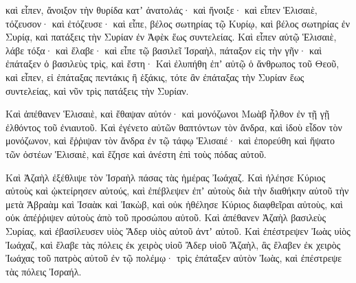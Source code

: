 {καὶ εἶπεν, ἄνοιξον τὴν θυρίδα κατʼ ἀνατολάς· καὶ ἤνοιξε· καὶ εἶπεν Ἑλισαιὲ, τόζευσον· καὶ ἐτόζευσε· καὶ εἶπε, βέλος σωτηρίας τῷ Κυρίῳ, καὶ βέλος σωτηρίας ἐν Συρίᾳ, καὶ πατάξεις τὴν Συρίαν ἐν Ἀφὲκ ἕως συντελείας.
Καὶ εἶπεν αὐτῷ Ἑλισαιὲ, λάβε τόξα· καὶ ἔλαβε· καὶ εἶπε τῷ βασιλεῖ Ἰσραὴλ, πάταξον εἰς τὴν γῆν· καὶ ἐπάταξεν ὁ βασιλεὺς τρὶς, καὶ ἔστη·
Καὶ ἐλυπήθη ἐπʼ αὐτῷ ὁ ἄνθρωπος τοῦ Θεοῦ, καὶ εἶπεν, εἰ ἐπάταξας πεντάκις ἢ ἑξάκις, τότε ἂν ἐπάταξας τὴν Συρίαν ἕως συντελείας, καὶ νῦν τρὶς πατάξεις τὴν Συρίαν.
\par }{\PP {}Καὶ ἀπέθανεν Ἑλισαιὲ, καὶ ἔθαψαν αὐτόν· καὶ μονόζωνοι Μωὰβ ἦλθον ἐν τῇ γῇ ἐλθόντος τοῦ ἐνιαυτοῦ.
Καὶ ἐγένετο αὐτῶν θαπτόντων τὸν ἄνδρα, καὶ ἰδοὺ εἶδον τὸν μονόζωνον, καὶ ἔῤῥιψαν τὸν ἄνδρα ἐν τῷ τάφῳ Ἑλισαιέ· καὶ ἐπορεύθη καὶ ἥψατο τῶν ὀστέων Ἑλισαιὲ, καὶ ἔζησε καὶ ἀνέστη ἐπὶ τοὺς πόδας αὐτοῦ.
\par }{\PP {}Καὶ Ἀζαὴλ ἐξέθλιψε τὸν Ἰσραὴλ πάσας τὰς ἡμέρας Ἰωάχαζ.
Καὶ ἠλέησε Κύριος αὐτοὺς καὶ ᾠκτείρησεν αὐτούς, καὶ ἐπέβλεψεν ἐπʼ αὐτοὺς διὰ τὴν διαθήκην αὐτοῦ τὴν μετὰ Ἁβραὰμ καὶ Ἰσαὰκ καὶ Ἰακὼβ, καὶ οὐκ ἠθέλησε Κύριος διαφθεῖραι αὐτοὺς, καὶ οὐκ ἀπέῤῥιψεν αὐτοὺς ἀπὸ τοῦ προσώπου αὐτοῦ.
Καὶ ἀπέθανεν Ἀζαὴλ βασιλεὺς Συρίας, καὶ ἐβασίλευσεν υἱὸς Ἄδερ υἱὸς αὐτοῦ ἀντʼ αὐτοῦ.
Καὶ ἐπέστρεψεν Ἰωὰς υἱὸς Ἰωάχαζ, καὶ ἔλαβε τὰς πόλεις ἐκ χειρὸς υἱοῦ Ἄδερ υἱοῦ Ἄζαὴλ, ἃς ἔλαβεν ἐκ χειρὸς Ἰωάχας τοῦ πατρὸς αὐτοῦ ἐν τῷ πολέμῳ· τρὶς ἐπάταξεν αὐτὸν Ἰωὰς, καὶ ἐπέστρεψε τὰς πόλεις Ἰσραήλ.

}
